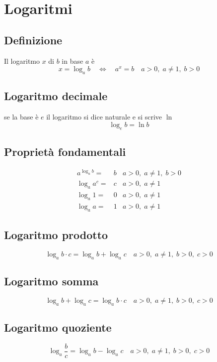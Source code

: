 \chapter{Logaritmi}
\section{Definizione}
Il logaritmo $x$ di $b$ in base $a$ è
\begin{equation}
x=\log_{a}b \quad\Longleftrightarrow\quad a^x=b\quad a>0,\; a\neq 1,\; b>0
\end{equation}
\section{Logaritmo decimale}
se la base è $e$ il logaritmo si dice naturale e si scrive $\ln$
\begin{equation}
\log_{e}b=\ln b
\end{equation}
\section{Proprietà fondamentali}
\begin{align}
a^{\log_{a}b}={}&b&a>0,\; a\neq 1,\; b>0\\
\log_{a}a^c=&c&a>0,\; a\neq 1\\
\log_{a}1=&0&a>0,\; a\neq 1\\
\log_{a}a=&1&a>0,\; a\neq 1
\end{align}
\section{Logaritmo prodotto}
\begin{equation}
\log_{a}b\cdot c=\log_{a}b+\log_{a}c\quad a>0,\;a\neq 1,\;b>0,\;c>0 
\end{equation}
\section{Logaritmo somma}
\begin{equation}
\log_{a}b+\log_{a}c=\log_{a}b\cdot c\quad a>0,\;a\neq 1,\;b>0,\;c>0 
\end{equation}
\section{Logaritmo quoziente}
\begin{equation}
\log_{a}\dfrac{b}{c}=\log_{a}b-\log_{a}c\quad a>0,\;a\neq 1,\;b>0,\;c>0 
\end{equation}
